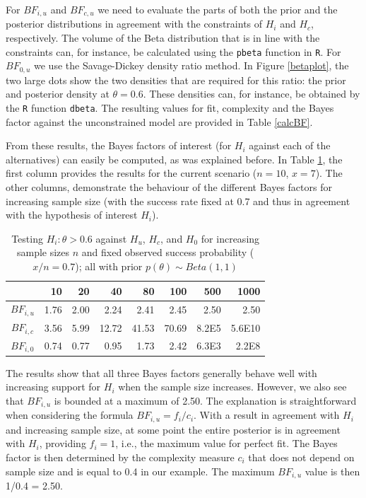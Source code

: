 \documentclass[11pt,reqno]{article}
\begin{document}
For $BF_{i,u}$ and $BF_{c,u}$ we need to evaluate the parts of both the prior and the posterior distributions in agreement with the constraints of $H_i$ and $H_c$, respectively. The volume of the Beta distribution that is in line with the constraints can, for instance, be calculated using the \verb"pbeta" function in \verb"R".
For $BF_{0,u}$ we use the Savage-Dickey density ratio method. In Figure \ref{betaplot}, the two large dots show the two densities that are required for this ratio: the prior and posterior density at $\theta=0.6$. These densities can, for instance, be obtained by the \verb"R" function \verb"dbeta". The resulting values for fit, complexity and the Bayes factor against the unconstrained model are provided in Table \ref{calcBF}.

From these results, the Bayes factors of interest (for $H_i$ against each of the alternatives) can easily be computed, as was explained before.
In Table \ref{Neffect}, the first column provides the results for the current scenario ($n=10$, $x=7$). The other columns, demonstrate the behaviour of the different Bayes factors for increasing sample size (with the success rate fixed at 0.7 and thus in agreement with the hypothesis of interest $H_i$).


\begin{table}[!h]
\caption{Testing $H_i: \theta>0.6$ against $H_u$, $H_c$, and $H_0$ for increasing sample sizes $n$ and fixed observed success probability ($x/n=0.7$); all with prior $p(\theta)\sim Beta(1,1)$}
\label{Neffect}
  \centering
     \begin{tabular}{crrrrrrr}\hline
             & 10    & 20    & 40   & 80   & 100  & 500  & 1000  \\ \hline
 $BF_{i,u}$  & 1.76  & 2.00  & 2.24 & 2.41 & 2.45 & 2.50 & 2.50  \\
 $BF_{i,c}$  & 3.56  & 5.99  & 12.72& 41.53& 70.69& 8.2E5  & 5.6E10   \\
 $BF_{i,0}$  & 0.74  & 0.77  & 0.95 & 1.73 & 2.42 & 6.3E3  & 2.2E8   \\ \hline
\end{tabular}
\end{table}

The results show that all three Bayes factors generally behave well with increasing support for $H_i$ when the sample size increases. However, we also see that $BF_{i,u}$ is bounded at a maximum of 2.50. The explanation is straightforward when considering the formula $BF_{i,u}=f_i/c_i$. With a result in agreement with $H_i$ and increasing sample size, at some point the entire posterior is in agreement with $H_i$, providing $f_i=1$, i.e., the maximum value for perfect fit. The Bayes factor is then determined by the complexity measure $c_i$ that does not depend on sample size and is equal to 0.4 in our example. The maximum $BF_{i,u}$ value is then 1/0.4 = 2.50.
\end{document}
